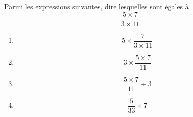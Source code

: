 

\begin{rituel}
    Parmi les expressions suivantes, dire lesquelles sont égales à
    \begin{equation}
        \frac{ 5\times 7 }{ 3\times 11 }.
    \end{equation}
    \begin{multicols}{2}
    \begin{enumerate}
        \item
            \begin{equation}
                5\times \frac{ 7 }{ 3\times 11 }
            \end{equation}
        \item
            \begin{equation}
                3\times \frac{ 5\times 7 }{ 11 }
            \end{equation}
        \item
            \begin{equation}
                \frac{ 5\times 7 }{ 11 }\div 3
            \end{equation}
        \item
            \begin{equation}
                \frac{ 5 }{ 33 }\times 7
            \end{equation}
    \end{enumerate}
    \end{multicols}
\end{rituel}
